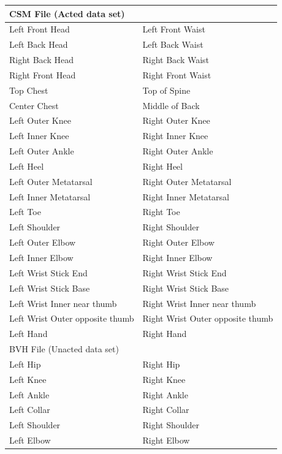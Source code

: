 \documentclass[]{report}   %
\begin{document}
\begin{table}[htbp]
  \centering
    \begin{tabular}{l|l}
    \toprule
    CSM File (Acted data set)  \\
    \midrule
    Left Front Head  & Left Front Waist  \\
    Left Back Head  & Left Back Waist  \\
    Right Back Head  & Right Back Waist  \\
    Right Front Head  & Right Front Waist  \\
    Top Chest  & Top of Spine  \\
    Center Chest  & Middle of Back  \\
    Left Outer Knee  & Right Outer Knee  \\
    Left Inner Knee & Right Inner Knee \\
    Left Outer Ankle  & Right Outer Ankle  \\
    Left Heel & Right Heel \\
    Left Outer Metatarsal  & Right Outer Metatarsal  \\
    Left Inner Metatarsal & Right Inner Metatarsal \\
    Left Toe  & Right Toe  \\
    Left Shoulder  & Right Shoulder  \\
    Left Outer Elbow  & Right Outer Elbow  \\
    Left Inner Elbow & Right Inner Elbow \\
    Left Wrist Stick End  & Right Wrist Stick End  \\
    Left Wrist Stick Base  & Right Wrist Stick Base   \\
    Left Wrist Inner near thumb & Right Wrist Inner near thumb \\
    Left Wrist Outer opposite thumb & Right Wrist Outer opposite thumb  \\
    Left Hand  & Right Hand  \\
    \midrule
    BVH File (Unacted data set)  \\
	\midrule
		Left Hip	&  Right Hip	\\
		Left Knee&	Right Knee \\
		Left Ankle & Right Ankle \\
		Left Collar & Right Collar \\
		Left Shoulder & Right Shoulder \\
		Left Elbow & Right Elbow \\

\end{tabular}
\end{table}
\end{document}
